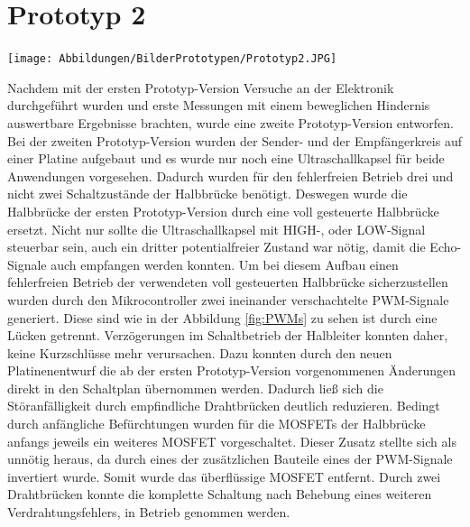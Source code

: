 \section{Prototyp 2}
\begin{center}
\begin{minipage}{0.75\textwidth}
\texttt{[image: Abbildungen/BilderPrototypen/Prototyp2.JPG]}
\label{fig:Prototyp2}
\end{minipage}
\end{center}
Nachdem mit der ersten Prototyp-Version Versuche an der Elektronik durchgeführt wurden und erste Messungen mit einem beweglichen Hindernis auswertbare Ergebnisse brachten, wurde eine zweite Prototyp-Version entworfen. Bei der zweiten Prototyp-Version wurden der Sender- und der Empfängerkreis auf einer Platine aufgebaut und es wurde nur noch eine Ultraschallkapsel für beide Anwendungen vorgesehen. Dadurch wurden für den fehlerfreien Betrieb drei und nicht zwei Schaltzustände der Halbbrücke benötigt. Deswegen wurde die Halbbrücke der ersten Prototyp-Version durch eine voll gesteuerte Halbbrücke ersetzt. Nicht nur sollte die Ultraschallkapsel mit HIGH-, oder LOW-Signal steuerbar sein, auch ein dritter potentialfreier Zustand war nötig, damit die Echo-Signale auch empfangen werden konnten. Um bei diesem Aufbau einen fehlerfreien Betrieb der verwendeten voll gesteuerten Halbbrücke sicherzustellen wurden durch den Mikrocontroller zwei ineinander verschachtelte PWM-Signale generiert. Diese sind wie in der Abbildung \ref{fig:PWMs} zu sehen ist durch eine Lücken getrennt. Verzögerungen im Schaltbetrieb der Halbleiter konnten daher, keine Kurzschlüsse mehr verursachen. Dazu konnten durch den neuen Platinenentwurf die ab der ersten Prototyp-Version vorgenommenen Änderungen direkt in den Schaltplan übernommen werden. Dadurch ließ sich die Störanfälligkeit durch empfindliche Drahtbrücken deutlich reduzieren. Bedingt durch anfängliche Befürchtungen wurden für die MOSFETs der Halbbrücke anfangs jeweils ein weiteres MOSFET vorgeschaltet. Dieser Zusatz stellte sich als unnötig heraus, da durch eines der zusätzlichen Bauteile eines der PWM-Signale invertiert wurde. Somit wurde das überflüssige MOSFET entfernt. Durch zwei Drahtbrücken konnte die komplette Schaltung nach Behebung eines weiteren Verdrahtungsfehlers, in Betrieb genommen werden.\\
